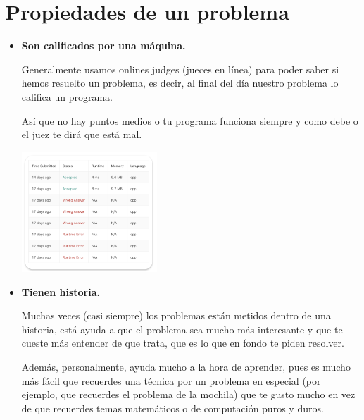 \documentclass[12pt, fleqn]{report}                             %
\theoremstyle{break}                                            %
\begin{document}
        \clearpage
        \section{Propiedades de un problema}

            \begin{itemize}
                \item \textbf{Son calificados por una máquina.}

                    Generalmente usamos onlines judges (jueces en línea) para poder saber si hemos
                    resuelto un problema, es decir, al final del día nuestro problema lo califica 
                    un programa. 

                    Así que no hay puntos medios o tu programa funciona siempre y como debe o el juez
                    te dirá que está mal.

                    \includegraphics[width=0.4\textwidth]{Example1}

                \item \textbf{Tienen historia.}
                
                    Muchas veces (casi siempre) los problemas están metidos dentro de una historia,
                    está ayuda a que el problema sea mucho más interesante y que te cueste más entender de que
                    trata, que es lo que en fondo te piden resolver.

                    Además, personalmente, ayuda mucho a la hora de aprender, pues es mucho más fácil
                    que recuerdes una técnica por un problema en especial (por ejemplo, que recuerdes
                    el problema de la mochila) que te gusto mucho en vez de que recuerdes temas matemáticos o
                    de computación puros y duros.


\end{itemize}
\end{document}
